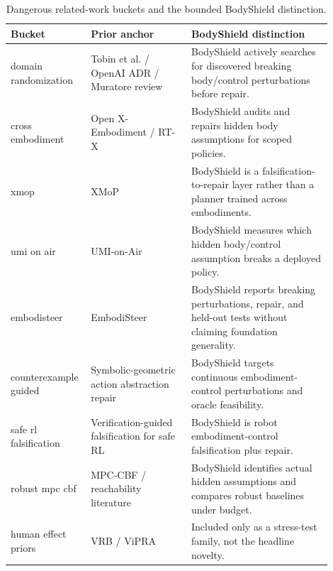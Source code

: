 \begin{table}[t]
\caption{Dangerous related-work buckets and the bounded BodyShield distinction.}
\label{tab:dangerous-prior}
\centering\footnotesize
\begin{tabular}{p{0.18\linewidth}p{0.30\linewidth}p{0.42\linewidth}}
\toprule
Bucket & Prior anchor & BodyShield distinction \\
\midrule
domain randomization & Tobin et al. / OpenAI ADR / Muratore review & BodyShield actively searches for discovered breaking body/control perturbations before repair. \\
cross embodiment & Open X-Embodiment / RT-X & BodyShield audits and repairs hidden body assumptions for scoped policies. \\
xmop & XMoP & BodyShield is a falsification-to-repair layer rather than a planner trained across embodiments. \\
umi on air & UMI-on-Air & BodyShield measures which hidden body/control assumption breaks a deployed policy. \\
embodisteer & EmbodiSteer & BodyShield reports breaking perturbations, repair, and held-out tests without claiming foundation generality. \\
counterexample guided & Symbolic-geometric action abstraction repair & BodyShield targets continuous embodiment-control perturbations and oracle feasibility. \\
safe rl falsification & Verification-guided falsification for safe RL & BodyShield is robot embodiment-control falsification plus repair. \\
robust mpc cbf & MPC-CBF / reachability literature & BodyShield identifies actual hidden assumptions and compares robust baselines under budget. \\
human effect priors & VRB / ViPRA & Included only as a stress-test family, not the headline novelty. \\
\bottomrule
\end{tabular}
\end{table}
